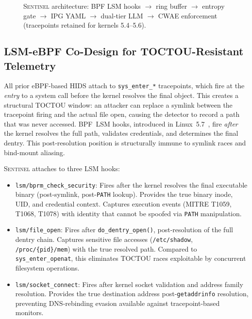 \documentclass[journal]{IEEEtran}
\newcommand{\sentinel}{\textsc{Sentinel}}
\newcommand{\ipg}{IPG}
\newcommand{\cwae}{CWAE}
\begin{document}
\begin{figure}[!t]
{%
}
\caption{\sentinel{} architecture: BPF LSM hooks $\to$ ring buffer $\to$
entropy gate $\to$ \ipg{} YAML $\to$ dual-tier LLM $\to$ \cwae{}
enforcement (tracepoints retained for kernels 5.4--5.6).}
\label{fig:arch}
\end{figure}

\subsection{LSM-eBPF Co-Design for TOCTOU-Resistant Telemetry}
\label{sec:lsm}

All prior eBPF-based HIDS attach to \texttt{sys\_enter\_*} tracepoints, which
fire at the \emph{entry} to a system call before the kernel resolves the final
object.  This creates a structural TOCTOU window: an attacker can replace a
symlink between the tracepoint firing and the actual file open, causing the
detector to record a path that was never accessed.  BPF~LSM hooks, introduced
in Linux~5.7~\cite{bpf_lsm_kernel}, fire \emph{after} the kernel resolves the
full path, validates credentials, and determines the final dentry.  This
post-resolution position is structurally immune to symlink races and
bind-mount aliasing.

\sentinel{} attaches to three LSM hooks:

\begin{itemize}
  \item \texttt{lsm/bprm\_check\_security}: Fires after the kernel resolves the
        final executable binary (post-symlink, post-\texttt{PATH} lookup).
        Provides the true binary inode, UID, and credential context.  Captures
        execution events (MITRE T1059, T1068, T1078) with identity that cannot
        be spoofed via \texttt{PATH} manipulation.
  \item \texttt{lsm/file\_open}: Fires after \texttt{do\_dentry\_open()},
        post-resolution of the full dentry chain.  Captures sensitive file
        accesses (\texttt{/etc/shadow}, \texttt{/proc/\{pid\}/mem}) with the
        true resolved path.  Compared to \texttt{sys\_enter\_openat}, this
        eliminates TOCTOU races exploitable by concurrent filesystem operations.
  \item \texttt{lsm/socket\_connect}: Fires after kernel socket validation and
        address family resolution.  Provides the true destination address
        post-\texttt{getaddrinfo} resolution, preventing DNS-rebinding evasion
        available against tracepoint-based monitors.
\end{itemize}
\end{document}

